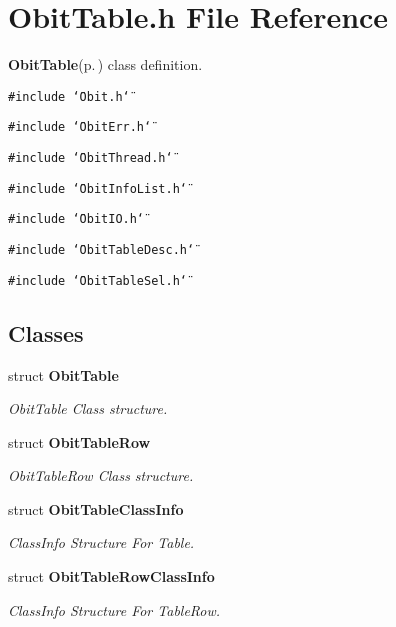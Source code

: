 \section{Obit\-Table.h File Reference}
\label{ObitTable_8h}
{\bf Obit\-Table}{\rm (p.\,\pageref{structObitTable})} class definition. 

{\tt \#include \char`\"{}Obit.h\char`\"{}}\par
{\tt \#include \char`\"{}Obit\-Err.h\char`\"{}}\par
{\tt \#include \char`\"{}Obit\-Thread.h\char`\"{}}\par
{\tt \#include \char`\"{}Obit\-Info\-List.h\char`\"{}}\par
{\tt \#include \char`\"{}Obit\-IO.h\char`\"{}}\par
{\tt \#include \char`\"{}Obit\-Table\-Desc.h\char`\"{}}\par
{\tt \#include \char`\"{}Obit\-Table\-Sel.h\char`\"{}}\par
\subsection*{Classes}
\begin{CompactItemize}
\item 
struct {\bf Obit\-Table}
\begin{CompactList}\small\item\em Obit\-Table Class structure. \item\end{CompactList}\item 
struct {\bf Obit\-Table\-Row}
\begin{CompactList}\small\item\em Obit\-Table\-Row Class structure. \item\end{CompactList}\item 
struct {\bf Obit\-Table\-Class\-Info}
\begin{CompactList}\small\item\em Class\-Info Structure For Table. \item\end{CompactList}\item 
struct {\bf Obit\-Table\-Row\-Class\-Info}
\begin{CompactList}\small\item\em Class\-Info Structure For Table\-Row. \item\end{CompactList}\end{CompactItemize}
